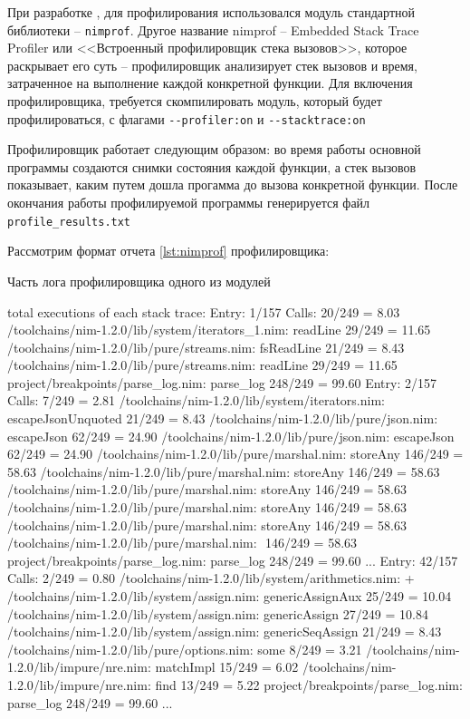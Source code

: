При разработке {\ProgModule}, для профилирования использовался
модуль стандартной библиотеки -- \verb|nimprof|. Другое название nimprof --
Embedded Stack Trace Profiler или <<Встроенный профилировщик стека вызовов>>,
которое раскрывает его суть -- профилировщик анализирует стек вызовов и время,
затраченное на выполнение каждой конкретной функции.
Для включения профилировщика, требуется скомпилировать модуль, который будет
профилироваться, с флагами \verb|--profiler:on| и \verb|--stacktrace:on|

Профилировщик работает следующим образом:
во время работы основной программы создаются снимки состояния каждой функции,
а стек вызовов показывает, каким путем дошла прогамма до вызова конкретной 
функции. После окончания работы профилируемой программы генерируется файл
\verb|profile_results.txt|

Рассмотрим формат отчета \autoref{lst:nimprof} профилировщика:
\begin{ListingEnv}[!h]
    \captiondelim{ }
    \caption{Часть лога профилировщика одного из модулей}\label{lst:nimprof}
    \small
    \begin{Verb}[]
total executions of each stack trace:
Entry: 1/157 Calls: 20/249 = 8.03%
  /toolchains/nim-1.2.0/lib/system/iterators_1.nim: readLine 29/249 = 11.65%
  /toolchains/nim-1.2.0/lib/pure/streams.nim: fsReadLine 21/249 = 8.43%
  /toolchains/nim-1.2.0/lib/pure/streams.nim: readLine 29/249 = 11.65%
  project/breakpoints/parse_log.nim: parse_log 248/249 = 99.60%
Entry: 2/157 Calls: 7/249 = 2.81%
  /toolchains/nim-1.2.0/lib/system/iterators.nim: escapeJsonUnquoted 21/249 = 8.43%
  /toolchains/nim-1.2.0/lib/pure/json.nim: escapeJson 62/249 = 24.90%
  /toolchains/nim-1.2.0/lib/pure/json.nim: escapeJson 62/249 = 24.90%
  /toolchains/nim-1.2.0/lib/pure/marshal.nim: storeAny 146/249 = 58.63%
  /toolchains/nim-1.2.0/lib/pure/marshal.nim: storeAny 146/249 = 58.63%
  /toolchains/nim-1.2.0/lib/pure/marshal.nim: storeAny 146/249 = 58.63%
  /toolchains/nim-1.2.0/lib/pure/marshal.nim: storeAny 146/249 = 58.63%
  /toolchains/nim-1.2.0/lib/pure/marshal.nim: storeAny 146/249 = 58.63%
  /toolchains/nim-1.2.0/lib/pure/marshal.nim: $$ 146/249 = 58.63%
  project/breakpoints/parse_log.nim: parse_log 248/249 = 99.60%
  ...
Entry: 42/157 Calls: 2/249 = 0.80%
  /toolchains/nim-1.2.0/lib/system/arithmetics.nim: +%
  /toolchains/nim-1.2.0/lib/system/assign.nim: genericAssignAux 25/249 = 10.04%
  /toolchains/nim-1.2.0/lib/system/assign.nim: genericAssign 27/249 = 10.84%
  /toolchains/nim-1.2.0/lib/system/assign.nim: genericSeqAssign 21/249 = 8.43%
  /toolchains/nim-1.2.0/lib/pure/options.nim: some 8/249 = 3.21%
  /toolchains/nim-1.2.0/lib/impure/nre.nim: matchImpl 15/249 = 6.02%
  /toolchains/nim-1.2.0/lib/impure/nre.nim: find 13/249 = 5.22%
  project/breakpoints/parse_log.nim: parse_log 248/249 = 99.60%
  ...
    \end{Verb}
\end{ListingEnv}

